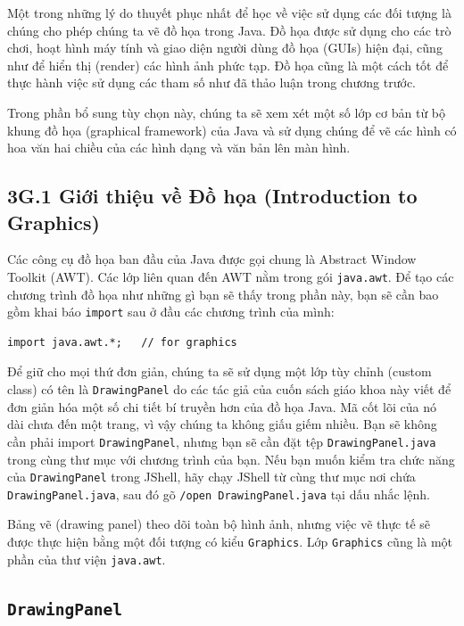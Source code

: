 Một trong những lý do thuyết phục nhất để học về việc sử dụng các đối
tượng là chúng cho phép chúng ta vẽ đồ họa trong Java. Đồ họa được sử
dụng cho các trò chơi, hoạt hình máy tính và giao diện người dùng đồ họa
(GUIs) hiện đại, cũng như để hiển thị (render) các hình ảnh phức tạp. Đồ
họa cũng là một cách tốt để thực hành việc sử dụng các tham số như đã
thảo luận trong chương trước.

Trong phần bổ sung tùy chọn này, chúng ta sẽ xem xét một số lớp cơ bản
từ bộ khung đồ họa (graphical framework) của Java và sử dụng chúng để vẽ
các hình có hoa văn hai chiều của các hình dạng và văn bản lên màn hình.

\subsection{3G.1 Giới thiệu về Đồ họa (Introduction to
Graphics)}\label{g.1-giux1edbi-thiux1ec7u-vux1ec1-ux111ux1ed3-hux1ecda-introduction-to-graphics-1}

Các công cụ đồ họa ban đầu của Java được gọi chung là Abstract Window
Toolkit (AWT). Các lớp liên quan đến AWT nằm trong gói
\texttt{java.awt}. Để tạo các chương trình đồ họa như những gì bạn sẽ
thấy trong phần này, bạn sẽ cần bao gồm khai báo \texttt{import} sau ở
đầu các chương trình của mình:

\begin{verbatim}
import java.awt.*;   // for graphics
\end{verbatim}

Để giữ cho mọi thứ đơn giản, chúng ta sẽ sử dụng một lớp tùy chỉnh
(custom class) có tên là \texttt{DrawingPanel} do các tác giả của cuốn
sách giáo khoa này viết để đơn giản hóa một số chi tiết bí truyền hơn
của đồ họa Java. Mã cốt lõi của nó dài chưa đến một trang, vì vậy chúng
ta không giấu giếm nhiều. Bạn sẽ không cần phải import
\texttt{DrawingPanel}, nhưng bạn sẽ cần đặt tệp
\texttt{DrawingPanel.java} trong cùng thư mục với chương trình của bạn.
Nếu bạn muốn kiểm tra chức năng của \texttt{DrawingPanel} trong JShell,
hãy chạy JShell từ cùng thư mục nơi chứa \texttt{DrawingPanel.java}, sau
đó gõ \texttt{/open\ DrawingPanel.java} tại dấu nhắc lệnh.

Bảng vẽ (drawing panel) theo dõi toàn bộ hình ảnh, nhưng việc vẽ thực tế
sẽ được thực hiện bằng một đối tượng có kiểu \texttt{Graphics}. Lớp
\texttt{Graphics} cũng là một phần của thư viện \texttt{java.awt}.

\subsection{\texorpdfstring{\texttt{DrawingPanel}}{DrawingPanel}}\label{drawingpanel}

